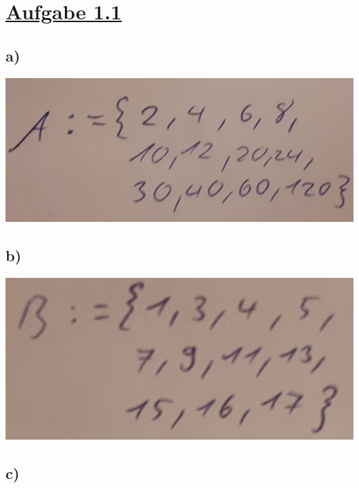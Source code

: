 \section*{\underline{Aufgabe 1.1}}

\subsection*{a)}

\includegraphics[width=\textwidth]{part/S1A1MA}

\subsection*{b)}

\includegraphics[width=\textwidth]{part/S1A1MB}

\subsection*{c)}

